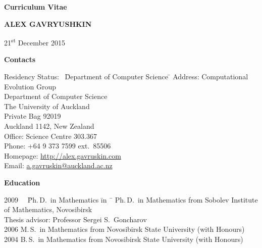\documentclass[12pt]{article}
\begin{document}
\centerline{\large \bf Curriculum Vitae}
\vskip5mm
\centerline{\Large \bfseries A\normalsize LEX \Large G\normalsize AVRYUSHKIN}
\vskip5mm
\centerline{21\textsuperscript{st} December 2015}
\vskip5mm

\centerline{\bf Contacts}
\begin{tabbing}
Residency Status:     \  \= Department of Computer Science \= \kill
Address:        \> Computational Evolution Group \\
		\> Department of Computer Science \\
		\> The University of Auckland\\
		\> Private Bag 92019\\
		\> Auckland 1142, New Zealand\\
Office:		\> Science Centre 303.367\\
Phone:		\> +64 9 373 7599 ext.\ 85506\\
Homepage:	\> \href{http://alex.gavruskin.com}{http://alex.gavruskin.com}\\
Email:		\> \href{mailto:a.gavruskin@auckland.ac.nz}{a.gavruskin@auckland.ac.nz}\\
\iftoggle{full}{
Residency Status: \>New Zealand permanent resident\\
Date of Birth:	\>  18\textsuperscript{th} January 1983\\
}{}
\end{tabbing}

\centerline{\bf Education}
\begin{tabbing}
2009 \ \ \= Ph.\,D.\ in Mathematics \= in \ \=        \> Ph.\,D.\ in Mathematics \>  from Sobolev Institute of Mathematics, Novosibirsk\\
                \>             \>  Thesis advisor: Professor Sergei S.\ Goncharov\\
2006       \> M.\,S.\ in Mathematics \>  from Novosibirsk State University (with Honours)\\
2004       \> B.\,S.\ in Mathematics \>  from Novosibirsk State University (with Honours)\\
\iftoggle{full}{
2000       \> Gold Medal High School Diploma, Novokuznetsk%
}{}
\end{tabbing}
\end{document}
